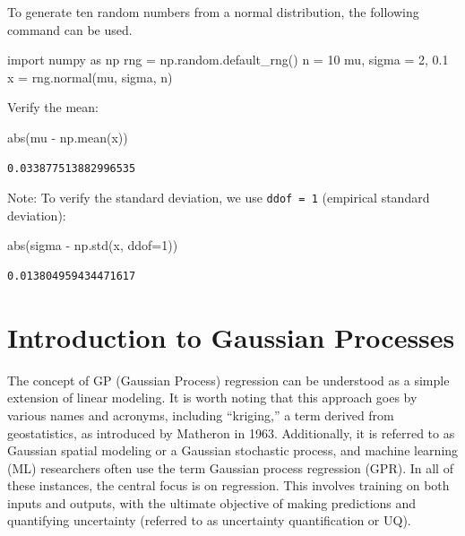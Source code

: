 \documentclass[
  letterpaper,
  DIV=11,
  numbers=noendperiod]{scrreprt}
\newenvironment{Shaded}{\begin{snugshade}}{\end{snugshade}}
\newcommand{\BuiltInTok}[1]{\textcolor[rgb]{0.00,0.23,0.31}{#1}}
\newcommand{\DecValTok}[1]{\textcolor[rgb]{0.68,0.00,0.00}{#1}}
\newcommand{\FloatTok}[1]{\textcolor[rgb]{0.68,0.00,0.00}{#1}}
\newcommand{\ImportTok}[1]{\textcolor[rgb]{0.00,0.46,0.62}{#1}}
\newcommand{\NormalTok}[1]{\textcolor[rgb]{0.00,0.23,0.31}{#1}}
\newcommand{\OperatorTok}[1]{\textcolor[rgb]{0.37,0.37,0.37}{#1}}
\begin{document}
To generate ten random numbers from a normal distribution, the following
command can be used.

\begin{Shaded}
\begin{Highlighting}[]
\ImportTok{import}\NormalTok{ numpy }\ImportTok{as}\NormalTok{ np}
\NormalTok{rng }\OperatorTok{=}\NormalTok{ np.random.default\_rng()}
\NormalTok{n }\OperatorTok{=} \DecValTok{10}
\NormalTok{mu, sigma }\OperatorTok{=} \DecValTok{2}\NormalTok{, }\FloatTok{0.1}
\NormalTok{x }\OperatorTok{=}\NormalTok{ rng.normal(mu, sigma, n)}
\end{Highlighting}
\end{Shaded}

Verify the mean:

\begin{Shaded}
\begin{Highlighting}[]
\BuiltInTok{abs}\NormalTok{(mu }\OperatorTok{{-}}\NormalTok{ np.mean(x))}
\end{Highlighting}
\end{Shaded}

\begin{verbatim}
0.033877513882996535
\end{verbatim}

Note: To verify the standard deviation, we use \texttt{ddof\ =\ 1}
(empirical standard deviation):

\begin{Shaded}
\begin{Highlighting}[]
\BuiltInTok{abs}\NormalTok{(sigma }\OperatorTok{{-}}\NormalTok{ np.std(x, ddof}\OperatorTok{=}\DecValTok{1}\NormalTok{))}
\end{Highlighting}
\end{Shaded}

\begin{verbatim}
0.013804959434471617
\end{verbatim}

\hypertarget{introduction-to-gaussian-processes}{%
\section{Introduction to Gaussian
Processes}\label{introduction-to-gaussian-processes}}

The concept of GP (Gaussian Process) regression can be understood as a
simple extension of linear modeling. It is worth noting that this
approach goes by various names and acronyms, including ``kriging,'' a
term derived from geostatistics, as introduced by Matheron in 1963.
Additionally, it is referred to as Gaussian spatial modeling or a
Gaussian stochastic process, and machine learning (ML) researchers often
use the term Gaussian process regression (GPR). In all of these
instances, the central focus is on regression. This involves training on
both inputs and outputs, with the ultimate objective of making
predictions and quantifying uncertainty (referred to as uncertainty
quantification or UQ).
\end{document}
